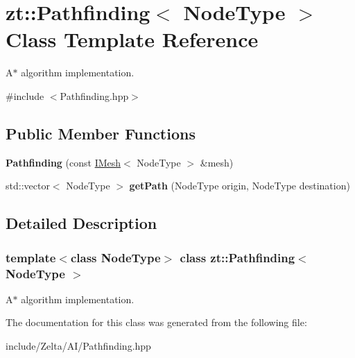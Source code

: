 \hypertarget{classzt_1_1_pathfinding}{}\section{zt\+:\+:Pathfinding$<$ Node\+Type $>$ Class Template Reference}
\label{classzt_1_1_pathfinding}


A$\ast$ algorithm implementation.  




{\ttfamily \#include $<$Pathfinding.\+hpp$>$}

\subsection*{Public Member Functions}
\begin{DoxyCompactItemize}
\item 
\mbox{\label{classzt_1_1_pathfinding_a9aa122d407ddce167ae47c3cf8b6b613}} 
{\bfseries Pathfinding} (const \hyperlink{classzt_1_1_i_mesh}{I\+Mesh}$<$ Node\+Type $>$ \&mesh)
\item 
\mbox{\label{classzt_1_1_pathfinding_a02410ef203e86cf562d32b0a585ada12}} 
std\+::vector$<$ Node\+Type $>$ {\bfseries get\+Path} (Node\+Type origin, Node\+Type destination)
\end{DoxyCompactItemize}


\subsection{Detailed Description}
\subsubsection*{template$<$class Node\+Type$>$\newline
class zt\+::\+Pathfinding$<$ Node\+Type $>$}

A$\ast$ algorithm implementation. 

The documentation for this class was generated from the following file\+:\begin{DoxyCompactItemize}
\item 
include/\+Zelta/\+A\+I/Pathfinding.\+hpp\end{DoxyCompactItemize}
